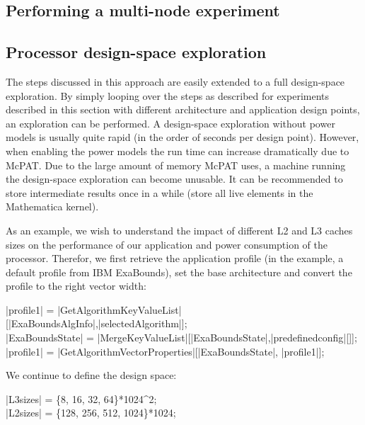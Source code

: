 \subsection{Performing a multi-node experiment}

\subsection{Processor design-space exploration}

The steps discussed in this approach are easily extended to a full design-space exploration. By simply looping over the steps as described for experiments described in this section with different architecture and application design points, an exploration can be performed. A design-space exploration without power models is usually quite rapid (in the order of seconds per design point). However, when enabling the power models the run time can increase dramatically due to McPAT. Due to the large amount of memory McPAT uses, a machine running the design-space exploration can become unusable. It can be recommended to store intermediate results once in a while (store all live elements in the Mathematica kernel).

As an example, we wish to understand the impact of different L2 and L3 caches sizes on the performance of our application and power consumption of the processor. Therefor, we first retrieve the application profile (in the example, a default profile from IBM ExaBounds), set the base architecture and convert the profile to the right vector width:
\begin{mma}
\In |profile1| = |GetAlgorithmKeyValueList|[|ExaBoundsAlgInfo|,\linebreak|selectedAlgorithm|]; \\
\In |ExaBoundsState| = |MergeKeyValueList|[|ExaBoundsState|,\linebreak|predefinedconfig|[]]; \\
\In |profile1| = |GetAlgorithmVectorProperties|[|ExaBoundsState|, |profile1|]; \\
\end{mma}
We continue to define the design space:
\begin{mma}
\In |L3sizes| = \{8, 16, 32, 64\}*1024^2; \\
\In |L2sizes| = \{128, 256, 512, 1024\}*1024; \\
\end{mma}

